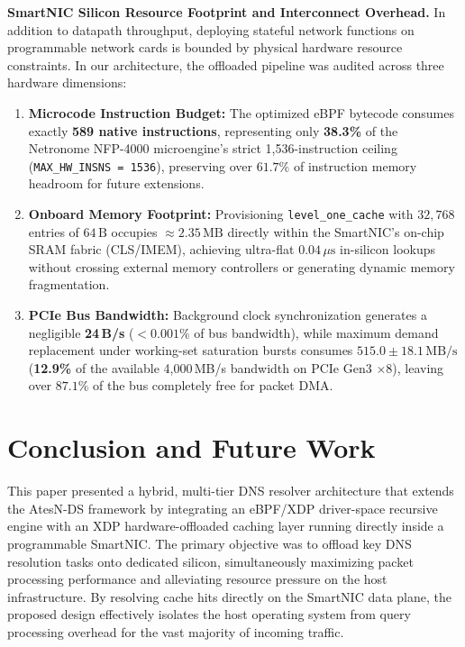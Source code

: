 \documentclass[a4paper,fleqn,colorlinks,hidelinks]{cas-sc}
\begin{document}
\textbf{SmartNIC Silicon Resource Footprint and Interconnect Overhead.} 
In addition to datapath throughput, deploying stateful network functions on programmable network cards is bounded by physical hardware resource constraints. In our architecture, the offloaded pipeline was audited across three hardware dimensions:
\begin{enumerate}
    \item \textbf{Microcode Instruction Budget:} The optimized eBPF bytecode consumes exactly \textbf{589 native instructions}, representing only \textbf{38.3\%} of the Netronome NFP-4000 microengine's strict 1,536-instruction ceiling (\texttt{MAX\_HW\_INSNS = 1536}), preserving over $61.7\%$ of instruction memory headroom for future extensions.
    \item \textbf{Onboard Memory Footprint:} Provisioning \texttt{level\_one\_cache} with $32{,}768$ entries of $64\,\text{B}$ occupies $\approx 2.35\,\text{MB}$ directly within the SmartNIC's on-chip SRAM fabric (CLS/IMEM), achieving ultra-flat $0.04\,\mu\text{s}$ in-silicon lookups without crossing external memory controllers or generating dynamic memory fragmentation.
    \item \textbf{PCIe Bus Bandwidth:} Background clock synchronization generates a negligible \textbf{24\,B/s} ($<0.001\%$ of bus bandwidth), while maximum demand replacement under working-set saturation bursts consumes $515.0 \pm 18.1\,\text{MB/s}$ (\textbf{12.9\%} of the available 4,000\,MB/s bandwidth on PCIe Gen3 $\times8$), leaving over $87.1\%$ of the bus completely free for packet DMA.
\end{enumerate}

\section{Conclusion and Future Work}
\label{sec:conclusion}

This paper presented a hybrid, multi-tier DNS resolver architecture that extends the AtesN-DS framework by integrating an eBPF/XDP driver-space recursive engine with an XDP hardware-offloaded caching layer running directly inside a programmable SmartNIC. The primary objective was to offload key DNS resolution tasks onto dedicated silicon, simultaneously maximizing packet processing performance and alleviating resource pressure on the host infrastructure. By resolving cache hits directly on the SmartNIC data plane, the proposed design effectively isolates the host operating system from query processing overhead for the vast majority of incoming traffic.
\end{document}
